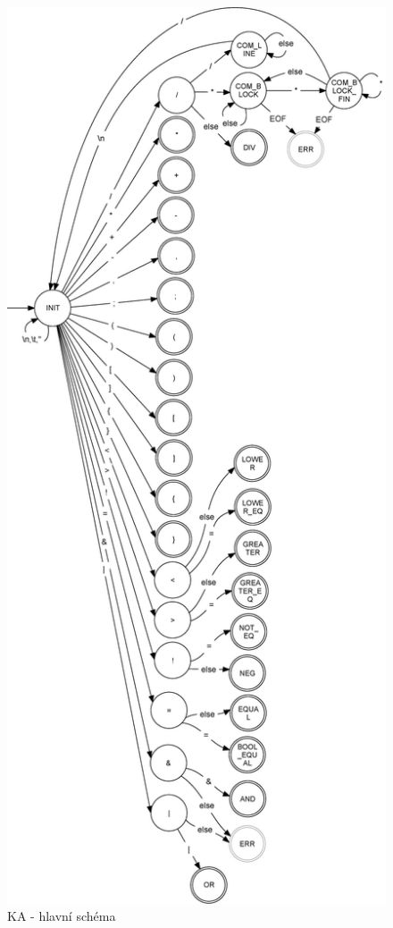 \documentclass[a4paper,11pt]{article}
\begin{document}
\begin{figure}[H]
	\centering
	\includegraphics[scale=.31]{FSM_MAIN.eps}
	\caption{KA - hlavní schéma}
\end{figure}
\end{document}
